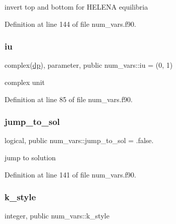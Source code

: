 invert top and bottom for H\+E\+L\+E\+NA equilibria 



Definition at line 144 of file num\+\_\+vars.\+f90.

\mbox{\label{namespacenum__vars_a3b9303c24ebbdff7b366337702795211}} 
\subsubsection{\texorpdfstring{iu}{iu}}
{\footnotesize\ttfamily complex(\hyperlink{namespacenum__vars_a03802aa2bd86439d7a9370836fabf3f2}{dp}), parameter, public num\+\_\+vars\+::iu = (0, 1)}



complex unit 



Definition at line 85 of file num\+\_\+vars.\+f90.

\mbox{\label{namespacenum__vars_acd9fb4b84728c986d5ecde709dcac940}} 
\subsubsection{\texorpdfstring{jump\+\_\+to\+\_\+sol}{jump\_to\_sol}}
{\footnotesize\ttfamily logical, public num\+\_\+vars\+::jump\+\_\+to\+\_\+sol = .false.}



jump to solution 



Definition at line 141 of file num\+\_\+vars.\+f90.

\mbox{\label{namespacenum__vars_ac53a1bb8d91f2b753690456a340cfd44}} 
\subsubsection{\texorpdfstring{k\+\_\+style}{k\_style}}
{\footnotesize\ttfamily integer, public num\+\_\+vars\+::k\+\_\+style}



